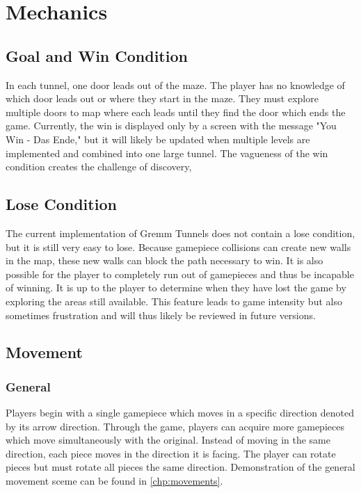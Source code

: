 \documentclass{scrreprt}
\begin{document}
	\chapter{Mechanics}		
		\section{Goal and Win Condition}
			In each tunnel, one door leads out of the maze. The player has no knowledge of which door leads out or where they start in the maze. They must explore multiple doors to map where each leads until they find the door which ends the game. Currently, the win is displayed only by a screen with the message "You Win - Das Ende," but it will likely be updated when multiple levels are implemented and combined into one large tunnel. The vagueness of the win condition creates the challenge of discovery, 
		
		\section{Lose Condition}
			The current implementation of Gremm Tunnels does not contain a lose condition, but it is still very easy to lose. Because gamepiece collisions can create new walls in the map, these new walls can block the path necessary to win. It is also possible for the player to completely run out of gamepieces and thus be incapable of winning. It is up to the player to determine when they have lost the game by exploring the areas still available. This feature leads to game intensity but also sometimes frustration and will thus likely be reviewed in future versions.
			
		\section{Movement}
			
			\subsection{General}
				Players begin with a single gamepiece which moves in a specific direction denoted by its arrow direction. Through the game, players can acquire more gamepieces which move simultaneously with the original. Instead of moving in the same direction, each piece moves in the direction it is facing. The player can rotate pieces but must rotate all pieces the same direction. Demonstration of the general movement sceme can be found in \autoref{chp:movements}. 
			
\end{document}
